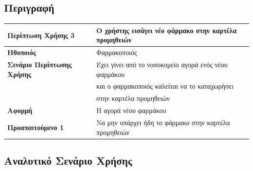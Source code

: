 \documentclass{article}
\newcommand\T{\rule{0pt}{2.6ex}}       %
\newcommand\B{\rule[-1.2ex]{0pt}{0pt}}
\begin{document}
\subsection{Περιγραφή}

\begin{center}
     \begin{tabular}{|l|l|}
     \hline
      \textbf{Περίπτωση Χρήσης 3} & Ο χρήστης εισάγει νέο φάρμακο στην καρτέλα προμηθειών \T\B \\ 
      \hline
      \textbf{Ηθοποιός} & Φαρμακοποιός \T\B \\
      \hline
      \textbf{Σενάριο Περίπτωσης Χρήσης} & Έχει γίνει από το νοσοκομείο αγορά ενός νέου φαρμάκου \T \\& και ο φαρμακοποιός καλείται να το καταχωρήσει \\& στην καρτέλα προμηθειών \B \\
      \hline
      \textbf{Αφορμή} & Η αγορά νέου φαρμάκου \T\B \\
      \hline
      \textbf{Προαπαιτούμενο 1} &  Να μην υπάρχει ήδη το φάρμακο στην καρτέλα προμηθειών \T\B \\
      \hline
     \end{tabular}
 \end{center}
 
   \subsection{Αναλυτικό Σενάριο Χρήσης}
 
\end{document}

